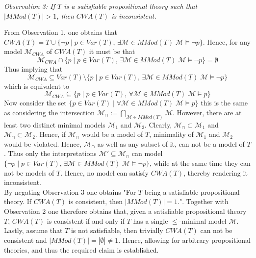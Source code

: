 \documentclass[11pt,a4paper]{article}
\begin{document}
\begin{enumerate}
\emph{Observation 3: If $T$ is a satisfiable propositional theory such that $|\mathit{MMod}(T)| > 1$, then $CWA(T)$ is inconsistent.}

From Observation 1, one obtains that $\mathit{CWA}(T)=T \cup \{ \neg p \mid p \in \mathit{Var}(T), \, \exists \mathcal{M} \in \mathit{MMod}(T) \; \mathcal{M} \models \neg p \}$. Hence, for any model $\mathcal{M}_{\mathit{CWA}}$ of  $\mathit{CWA}(T)$ it must be that 
\begin{equation*}
\mathcal{M}_{\mathit{CWA}} \cap \{ p \mid p \in \mathit{Var}(T), \, \exists \mathcal{M} \in \mathit{MMod}(T) \; \mathcal{M} \models \neg p \} = \emptyset
\end{equation*} 
Thus implying that 
\begin{equation*}
\mathcal{M}_{\mathit{CWA}} \subseteq \mathit{Var}(T)  \setminus \{ p \mid p \in \mathit{Var}(T), \, \exists \mathcal{M} \in \mathit{MMod}(T) \; \mathcal{M} \models \neg p \} 
\end{equation*} 
which is equivalent to 
\begin{equation*}
\mathcal{M}_{\mathit{CWA}} \subseteq \{ p \mid p \in \mathit{Var}(T), \,  \forall \mathcal{M} \in \mathit{MMod}(T) \; \mathcal{M} \models  p \} 
\end{equation*} 
Now consider the set $\{p \in \mathit{Var}(T) \mid  \forall \mathcal{M} \in \mathit{MMod}(T) \; \mathcal{M} \models  p\}$ this is the same as considering the intersection $\mathcal{M}_{\cap} := \bigcap_{\mathcal{M} \in \mathit{MMod}(T)} \mathcal{M}$. However, there are at least two distinct minimal models $\mathcal{M}_1$ and $\mathcal{M}_2$. Clearly, $\mathcal{M}_{\cap} \subset\mathcal{M}_1 $ and $\mathcal{M}_{\cap} \subset\mathcal{M}_2 $. Hence, if $\mathcal{M}_{\cap}$ would be a model of $T$, minimality of  $\mathcal{M}_1$ and $\mathcal{M}_2$ would be violated. Hence, $\mathcal{M}_{\cap} $ as well as any subset of it, can not be a model of $T$.
Thus only the interpretations $\mathcal{M}' \subseteq \mathcal{M}_{\cap}$ can model $ \{ \neg p \mid p \in \mathit{Var}(T), \, \exists \mathcal{M} \in \mathit{MMod}(T) \; \mathcal{M} \models \neg p \}$, while at the same time they can not be models of $T$. Hence, no model can satisfy $\mathit{CWA}(T)$, thereby rendering it inconsistent. \\


By negating Observation 3 one obtains "For $T$ being a satisfiable propositional theory. If $\mathit{CWA}(T)$ is consistent, then $|\mathit{MMod}(T)| =1$.". Together with Observation 2 one therefore obtains that, given a satisfiable propositional theory $T$, $\mathit{CWA}(T)$ is consistent if and only if $T$ has a single  $\leq$-minimal model $\mathcal{M}$. 
Lastly, assume that $T$ is not satisfiable, then trivially $\mathit{CWA}(T)$ can not be consistent and $|\mathit{MMod}(T)|=|\emptyset|\neq 1$.  Hence, allowing for arbitrary propositional theories, and thus the required claim is established. 


\end{enumerate}
\end{document}
